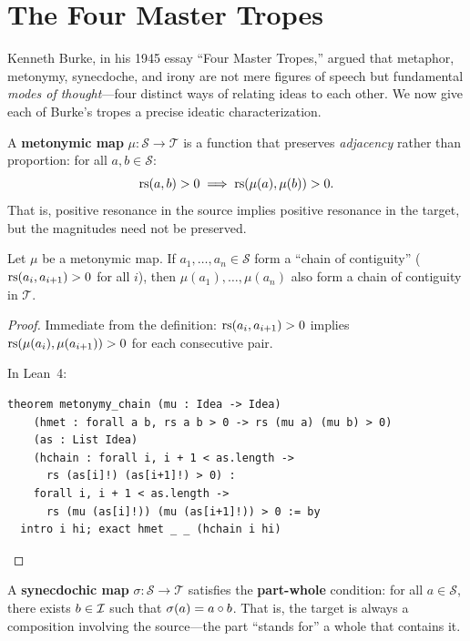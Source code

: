 \section{The Four Master Tropes}

Kenneth Burke, in his 1945 essay ``Four Master Tropes,'' argued that metaphor,
metonymy, synecdoche, and irony are not mere figures of speech but fundamental
\emph{modes of thought}---four distinct ways of relating ideas to each other.
We now give each of Burke's tropes a precise ideatic characterization.

\begin{definition}
\label{def:metonymy}
A \textbf{metonymic map} $\mu: \mathcal{S} \to \mathcal{T}$ is a function
that preserves \emph{adjacency} rather than proportion: for all
$a, b \in \mathcal{S}$:
\[
  \mathrm{rs}(a, b) > 0 \;\Longrightarrow\; \mathrm{rs}(\mu(a), \mu(b)) > 0.
\]
That is, positive resonance in the source implies positive resonance in the
target, but the magnitudes need not be preserved.
\end{definition}

\begin{theorem}
\label{thm:metonymy-positive}
Let $\mu$ be a metonymic map.  If $a_1, \ldots, a_n \in \mathcal{S}$ form
a ``chain of contiguity'' ($\mathrm{rs}(a_i, a_{i+1}) > 0$ for all $i$), then
$\mu(a_1), \ldots, \mu(a_n)$ also form a chain of contiguity in $\mathcal{T}$.
\end{theorem}

\begin{proof}
Immediate from the definition: $\mathrm{rs}(a_i, a_{i+1}) > 0$ implies
$\mathrm{rs}(\mu(a_i), \mu(a_{i+1})) > 0$ for each consecutive pair.

In Lean~4:
\begin{lstlisting}
theorem metonymy_chain (mu : Idea -> Idea)
    (hmet : forall a b, rs a b > 0 -> rs (mu a) (mu b) > 0)
    (as : List Idea)
    (hchain : forall i, i + 1 < as.length ->
      rs (as[i]!) (as[i+1]!) > 0) :
    forall i, i + 1 < as.length ->
      rs (mu (as[i]!)) (mu (as[i+1]!)) > 0 := by
  intro i hi; exact hmet _ _ (hchain i hi)
\end{lstlisting}
\end{proof}

\begin{definition}
\label{def:synecdoche}
A \textbf{synecdochic map} $\sigma: \mathcal{S} \to \mathcal{T}$ satisfies
the \textbf{part-whole} condition: for all $a \in \mathcal{S}$, there exists
$b \in \mathcal{I}$ such that $\sigma(a) = a \circ b$.  That is, the target is
always a composition involving the source---the part ``stands for'' a whole
that contains it.
\end{definition}

